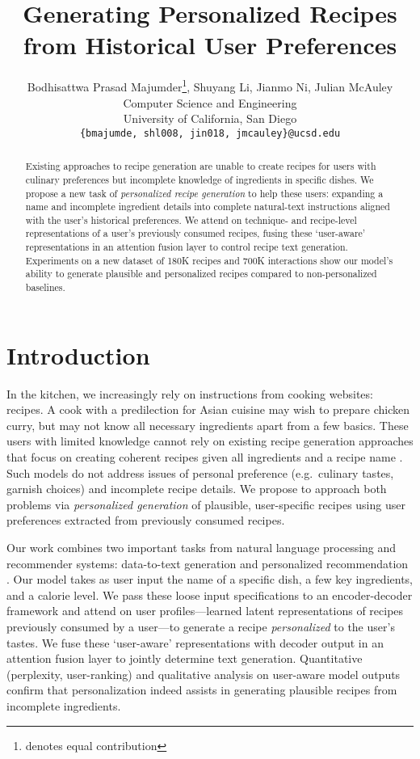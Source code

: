 \documentclass[11pt,a4paper]{article}
\title{
Generating Personalized Recipes from Historical User Preferences
}
\author{Bodhisattwa Prasad Majumder\thanks{\quad denotes equal contribution}, Shuyang Li\footnotemark[1], Jianmo Ni, Julian McAuley \\
 Computer Science and Engineering \\
 University of California, San Diego \\
 {\tt \{bmajumde, shl008, jin018, jmcauley\}@ucsd.edu} \\}
\date{}
\begin{document}
\maketitle
\begin{abstract}
    Existing approaches to recipe generation are unable to create recipes for users with culinary preferences but incomplete knowledge of ingredients in specific dishes.
    We propose a new task of \textit{personalized recipe generation} to help these users: expanding a name and incomplete ingredient details into complete natural-text instructions aligned with the user's historical preferences.
    We attend on technique- and recipe-level representations of a user's previously consumed recipes, fusing these `user-aware' representations in an attention fusion layer to control recipe text generation.
    Experiments on a new dataset of 180K recipes and 700K interactions show our model's ability to generate plausible and personalized recipes compared to non-personalized baselines.
\end{abstract}
\section{Introduction}

In the kitchen, we increasingly rely on instructions from cooking websites: recipes.
A cook with a predilection for Asian cuisine may wish to prepare chicken curry, but may not know all necessary ingredients apart from a few basics.
These users with limited knowledge cannot rely on existing recipe generation approaches that focus on creating coherent recipes given all ingredients and a recipe name \cite{kiddon2016globally}.
Such models do not address issues of personal preference (e.g.~culinary tastes, garnish choices) and incomplete recipe details.
We propose to approach both problems via \textit{personalized generation} of plausible, user-specific recipes using user preferences extracted from previously consumed recipes.

Our work combines two important tasks from natural language processing and recommender systems: data-to-text generation \cite{DBLP:journals/jair/GattK18} and personalized recommendation \cite{DBLP:conf/iui/RashidACLMKR02}.
Our model takes as user input the name of a specific dish, a few key ingredients, and a calorie level.
We pass these loose input specifications to an encoder-decoder framework and attend on user profiles---learned latent representations of recipes previously consumed by a user---to generate a recipe \textit{personalized} to the user's tastes.
We fuse these `user-aware' representations with decoder output in an attention fusion layer to jointly determine text generation.
Quantitative (perplexity, user-ranking) and qualitative analysis on user-aware model outputs confirm that personalization indeed assists in generating plausible recipes from incomplete ingredients.
\end{document}
